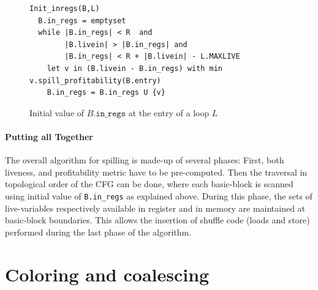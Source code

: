 {\begin{figure}
\begin{verbatim}
Init_inregs(B,L)
  B.in_regs = emptyset
  while |B.in_regs| < R  and
        |B.livein| > |B.in_regs| and
        |B.in_regs| < R + |B.livein| - L.MAXLIVE
    let v in (B.livein - B.in_regs) with min v.spill_profitability(B.entry)
    B.in_regs = B.in_regs U {v}
\end{verbatim}
\caption{\label{fig:ra:initloop}Initial value of $B.\texttt{in\_regs}$ at the entry of a loop $L$}
\end{figure}

\paragraph{Putting all Together}
The overall algorithm for spilling is made-up of several phases:
First, both liveness, and profitability metric have to be pre-computed.
Then the traversal in topological order of the CFG can be done, where each basic-block is scanned using initial value of \verb+B.in_regs+ as explained above.
During this phase, the sets of live-variables respectively available in register and in memory are maintained at basic-block boundaries.
This allows the insertion of shuffle code (loads and store) performed during the last phase of the algorithm.

\section{Coloring and coalescing}

}
